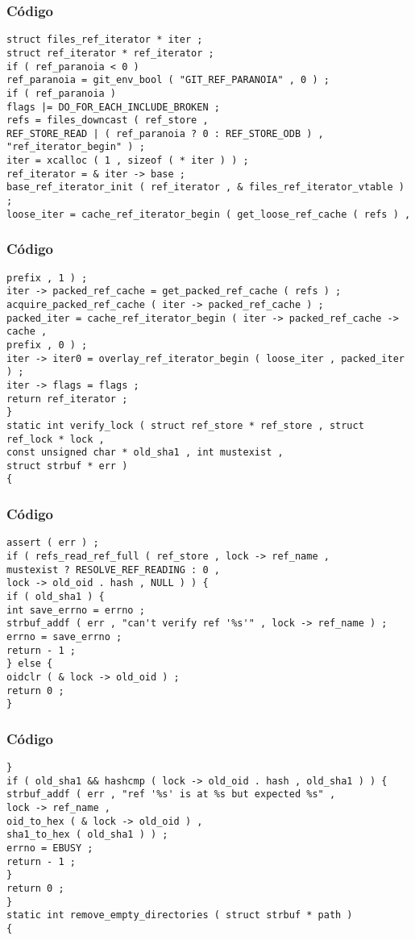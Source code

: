 \documentclass{beamer}
\begin{document}
\begin{frame}[fragile]
\frametitle{C\'odigo}
\begin{verbatim}
struct files_ref_iterator * iter ; 
struct ref_iterator * ref_iterator ; 
if ( ref_paranoia < 0 ) 
ref_paranoia = git_env_bool ( "GIT_REF_PARANOIA" , 0 ) ; 
if ( ref_paranoia ) 
flags |= DO_FOR_EACH_INCLUDE_BROKEN ; 
refs = files_downcast ( ref_store , 
REF_STORE_READ | ( ref_paranoia ? 0 : REF_STORE_ODB ) , 
"ref_iterator_begin" ) ; 
iter = xcalloc ( 1 , sizeof ( * iter ) ) ; 
ref_iterator = & iter -> base ; 
base_ref_iterator_init ( ref_iterator , & files_ref_iterator_vtable ) ; 
loose_iter = cache_ref_iterator_begin ( get_loose_ref_cache ( refs ) , 
\end{verbatim}
\end{frame}
\begin{frame}[fragile]
\frametitle{C\'odigo}
\begin{verbatim}
prefix , 1 ) ; 
iter -> packed_ref_cache = get_packed_ref_cache ( refs ) ; 
acquire_packed_ref_cache ( iter -> packed_ref_cache ) ; 
packed_iter = cache_ref_iterator_begin ( iter -> packed_ref_cache -> cache , 
prefix , 0 ) ; 
iter -> iter0 = overlay_ref_iterator_begin ( loose_iter , packed_iter ) ; 
iter -> flags = flags ; 
return ref_iterator ; 
} 
static int verify_lock ( struct ref_store * ref_store , struct ref_lock * lock , 
const unsigned char * old_sha1 , int mustexist , 
struct strbuf * err ) 
{ 
\end{verbatim}
\end{frame}
\begin{frame}[fragile]
\frametitle{C\'odigo}
\begin{verbatim}
assert ( err ) ; 
if ( refs_read_ref_full ( ref_store , lock -> ref_name , 
mustexist ? RESOLVE_REF_READING : 0 , 
lock -> old_oid . hash , NULL ) ) { 
if ( old_sha1 ) { 
int save_errno = errno ; 
strbuf_addf ( err , "can't verify ref '%s'" , lock -> ref_name ) ; 
errno = save_errno ; 
return - 1 ; 
} else { 
oidclr ( & lock -> old_oid ) ; 
return 0 ; 
} 
\end{verbatim}
\end{frame}
\begin{frame}[fragile]
\frametitle{C\'odigo}
\begin{verbatim}
} 
if ( old_sha1 && hashcmp ( lock -> old_oid . hash , old_sha1 ) ) { 
strbuf_addf ( err , "ref '%s' is at %s but expected %s" , 
lock -> ref_name , 
oid_to_hex ( & lock -> old_oid ) , 
sha1_to_hex ( old_sha1 ) ) ; 
errno = EBUSY ; 
return - 1 ; 
} 
return 0 ; 
} 
static int remove_empty_directories ( struct strbuf * path ) 
{ 
\end{verbatim}
\end{frame}
\end{document}
